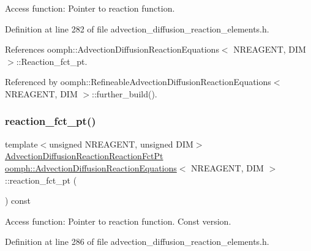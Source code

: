 Access function\+: Pointer to reaction function. 



Definition at line 282 of file advection\+\_\+diffusion\+\_\+reaction\+\_\+elements.\+h.



References oomph\+::\+Advection\+Diffusion\+Reaction\+Equations$<$ N\+R\+E\+A\+G\+E\+N\+T, D\+I\+M $>$\+::\+Reaction\+\_\+fct\+\_\+pt.



Referenced by oomph\+::\+Refineable\+Advection\+Diffusion\+Reaction\+Equations$<$ N\+R\+E\+A\+G\+E\+N\+T, D\+I\+M $>$\+::further\+\_\+build().

\mbox{\label{classoomph_1_1AdvectionDiffusionReactionEquations_a45552eb74d1da4b7c21c7e71b95faa3f}} 
\subsubsection{\texorpdfstring{reaction\+\_\+fct\+\_\+pt()}{reaction\_fct\_pt()}\hspace{0.1cm}{\footnotesize\ttfamily [2/2]}}
{\footnotesize\ttfamily template$<$unsigned N\+R\+E\+A\+G\+E\+NT, unsigned D\+IM$>$ \\
\hyperlink{classoomph_1_1AdvectionDiffusionReactionEquations_a74f8f0492147a5600b075cc64479f850}{Advection\+Diffusion\+Reaction\+Reaction\+Fct\+Pt} \hyperlink{classoomph_1_1AdvectionDiffusionReactionEquations}{oomph\+::\+Advection\+Diffusion\+Reaction\+Equations}$<$ N\+R\+E\+A\+G\+E\+NT, D\+IM $>$\+::reaction\+\_\+fct\+\_\+pt (\begin{DoxyParamCaption}{ }\end{DoxyParamCaption}) const\hspace{0.3cm}{\ttfamily [inline]}}



Access function\+: Pointer to reaction function. Const version. 



Definition at line 286 of file advection\+\_\+diffusion\+\_\+reaction\+\_\+elements.\+h.




